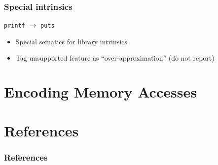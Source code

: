 \documentclass[aspectratio=169]{ctexbeamer}
\begin{document}
\begin{frame}
    \frametitle{Special intrinsics}
    \begin{center}
        \texttt{printf} $\rightarrow$ \texttt{puts}
    \end{center}

    \begin{itemize}
        \pause
        \item Special sematics for library intrinsics
              \pause
        \item Tag unsupported feature as ``over-approximation'' (do not report)
    \end{itemize}

\end{frame}


\section{Encoding Memory Accesses}

\section{References}


\begin{frame}[allowframebreaks]
    \frametitle{References}
    
    
\end{frame}
\end{document}
